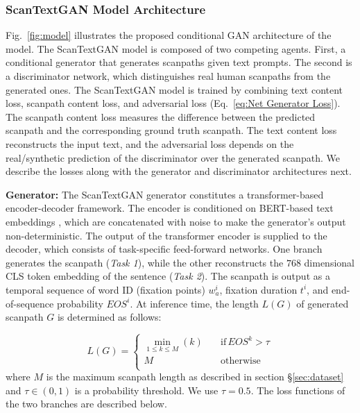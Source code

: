 \subsubsection{ScanTextGAN Model Architecture}
Fig.~\ref{fig:model} illustrates the proposed conditional GAN architecture of the model. The ScanTextGAN model is composed of two competing agents. First, a conditional generator that generates scanpaths given text prompts. The second is a discriminator network, which distinguishes real human scanpaths from the generated ones. The ScanTextGAN model is trained by combining text content loss, scanpath content loss, and adversarial loss (Eq.~\ref{eq:Net Generator Loss}). The scanpath content loss measures the difference between the predicted scanpath and the corresponding ground truth scanpath. The text content loss reconstructs the input text, and the adversarial loss depends on the real/synthetic prediction of the discriminator over the generated scanpath. We describe the losses along with the generator and discriminator architectures next.

 \textbf{Generator:} The ScanTextGAN generator constitutes a transformer-based encoder-decoder framework. The encoder is conditioned on BERT-based text embeddings \cite{devlin2018bert}, which are concatenated with noise to make the generator's output non-deterministic. The output of the transformer encoder is supplied to the decoder, which consists of task-specific feed-forward networks. One branch generates the scanpath (\textit{Task 1}), while the other reconstructs the $768$ dimensional CLS token embedding of the sentence (\textit{Task 2}). The scanpath is output as a temporal sequence of word ID (fixation points) $w_a^i$, fixation duration $t^i$, and end-of-sequence probability $EOS^i$. At inference time, the length $L(G)$ of generated scanpath $G$ is determined as follows:


\begin{equation}
L(G) = \begin{cases}
          \min_{1 \leq k \leq M} (k) \quad &\text{if} \, EOS^k > \tau \\
          M \quad &\text{otherwise} \, \\
     \end{cases}
\end{equation}
where $M$ is the maximum scanpath length as described in section \S\ref{sec:dataset} and $\tau \in (0,1)$ is a probability threshold. We use $\tau = 0.5$. The loss functions of the two branches are described below. 


